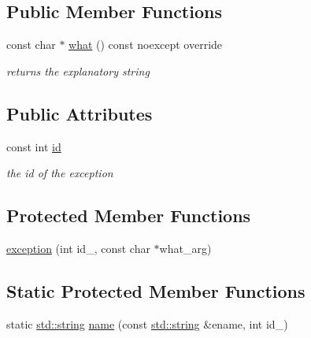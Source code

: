 \subsection*{Public Member Functions}
\begin{DoxyCompactItemize}
\item 
const char $\ast$ \hyperlink{classnlohmann_1_1detail_1_1exception_a0672c25ecdf14d1a071d4d6478a65af0}{what} () const noexcept override
\begin{DoxyCompactList}\small\item\em returns the explanatory string \end{DoxyCompactList}\end{DoxyCompactItemize}
\subsection*{Public Attributes}
\begin{DoxyCompactItemize}
\item 
const int \hyperlink{classnlohmann_1_1detail_1_1exception_a0d4589a3fb54e81646d986c05efa3b9a}{id}
\begin{DoxyCompactList}\small\item\em the id of the exception \end{DoxyCompactList}\end{DoxyCompactItemize}
\subsection*{Protected Member Functions}
\begin{DoxyCompactItemize}
\item 
\hyperlink{classnlohmann_1_1detail_1_1exception_ae323ad0d53bc724414c2233164e65657}{exception} (int id\+\_\+, const char $\ast$what\+\_\+arg)
\end{DoxyCompactItemize}
\subsection*{Static Protected Member Functions}
\begin{DoxyCompactItemize}
\item 
static \hyperlink{namespacenlohmann_1_1detail_a1ed8fc6239da25abcaf681d30ace4985ab45cffe084dd3d20d928bee85e7b0f21}{std\+::string} \hyperlink{classnlohmann_1_1detail_1_1exception_abf41a7e9178356314082284e6cfea278}{name} (const \hyperlink{namespacenlohmann_1_1detail_a1ed8fc6239da25abcaf681d30ace4985ab45cffe084dd3d20d928bee85e7b0f21}{std\+::string} \&ename, int id\+\_\+)
\end{DoxyCompactItemize}


